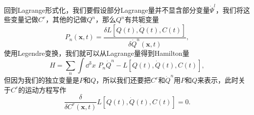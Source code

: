 \documentclass[9pt]{extbook}
\theoremstyle{plain}%
\begin{document}
回到Lagrange形式化，我们要假设部分Lagrange量并不显含部分变量$\dot{\Psi}^l$，我们将这些变量记做$C^r$，其他的记做$Q^n$，那么$Q^n$有共轭变量
\[
	P_n(\mathbf{x},t)=\frac{\delta L[Q(t),\dot{Q}(t),C(t)]}{\delta \dot{Q}^n(\mathbf{x},t)},
\]
使用Legendre变换，我们就可以从Lagrange量得到Hamilton量
\[
	H=\sum_n \int \dd^3 x \,\, P_n\dot{Q}^n-L[Q(t),\dot{Q}(t),C(t)],
\]
但因为我们的独立变量是$P$和$Q$，所以我们还要把$C^r$和$\dot{Q}^n$用$P$和$Q$来表示，此时关于$C^r$的运动方程写作
\[
	\frac{\delta}{\delta C^r(\mathbf{x},t)}L[Q(t),\dot{Q}(t),C(t)]=0.
\]
\end{document}
